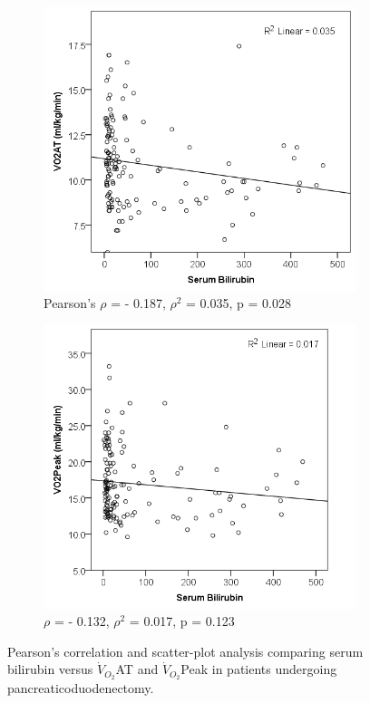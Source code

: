 \begin{figure}[p]
	\centering
	\begin{subfigure}{0.6\textwidth}
		\centering
		\includegraphics[width=\textwidth]{Figures/cpet_oj_scatter_at_bil}
		\caption{Pearson's $\rho$ = - 0.187, $\rho^2$ = 0.035, p = 0.028}
		\label{fig:cpet_oj_scatter_at_bil}
	\end{subfigure}
	\begin{subfigure}{0.6\textwidth}
		\centering
		\includegraphics[width=\textwidth]{Figures/cpet_oj_scatter_peak_bil}
		\caption{$\rho$ = - 0.132, $\rho^2$ = 0.017, p = 0.123}
		\label{fig:cpet_oj_scatter_peak_bil}
	\end{subfigure}
	
	\caption{Pearson's correlation and scatter-plot analysis comparing serum bilirubin versus $\dot{V}_{O_2}$AT and $\dot{V}_{O_2}$Peak in patients undergoing pancreaticoduodenectomy.}
	\label{fig:cpet_oj_scatter}
	
\end{figure}


